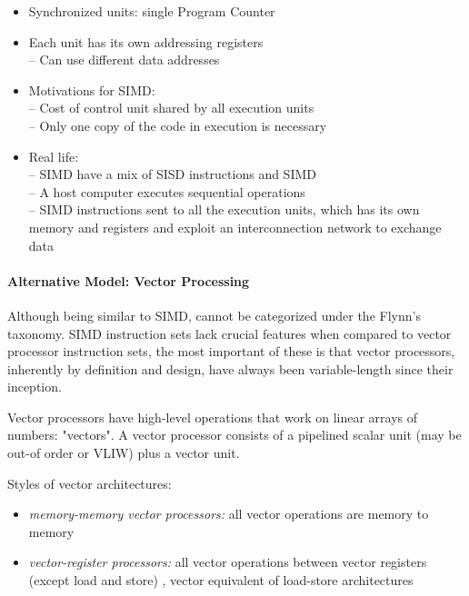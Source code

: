 \begin{itemize}
    \item[\textrightarrow] Synchronized units: single Program Counter
    \item[\textrightarrow] Each unit has its own addressing registers\\
    – Can use different data addresses
    \item[\textrightarrow] Motivations for SIMD:\\
    – Cost of control unit shared by all execution units\\
    – Only one copy of the code in execution is necessary
    \item[\textrightarrow] Real life:\\
    – SIMD have a mix of SISD instructions and SIMD\\
    – A host computer executes sequential operations\\
    – SIMD instructions sent to all the execution units, which
    has its own memory and registers and exploit an
    interconnection network to exchange data
\end{itemize}

\paragraph{Alternative Model: Vector Processing}
Although being similar to SIMD, cannot be categorized under the Flynn's taxonomy.
SIMD instruction sets lack crucial features when compared to vector processor instruction sets, the most important of
these is that vector processors, inherently by definition and design, have always been variable-length since their
inception.

Vector processors have high-level operations that work on linear arrays of numbers: "vectors".
A vector processor consists of a pipelined scalar unit (may be out-of order or VLIW) plus a vector unit.

Styles of vector architectures:
\begin{itemize}
    \item \textit{memory-memory vector processors:} all vector
    operations are memory to memory
    \item \textit{vector-register processors:} all vector operations between vector registers (except load and store)
    , vector equivalent of load-store architectures
\end{itemize}

